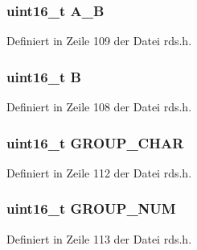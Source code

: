 \subsubsection[{A\+\_\+\+B}]{\setlength{\rightskip}{0pt plus 5cm}uint16\+\_\+t A\+\_\+\+B}\label{structgroup__2b_a226eb9a4ec1152d0c92ce7324916ad56}


Definiert in Zeile 109 der Datei rds.\+h.

\hypertarget{structgroup__2b_ae783bd90764c8455228772c025c064e4}{}
\subsubsection[{B}]{\setlength{\rightskip}{0pt plus 5cm}uint16\+\_\+t B}\label{structgroup__2b_ae783bd90764c8455228772c025c064e4}


Definiert in Zeile 108 der Datei rds.\+h.

\hypertarget{structgroup__2b_a66d4119990dc4c3e040a43885e9bb953}{}
\subsubsection[{G\+R\+O\+U\+P\+\_\+\+C\+H\+A\+R}]{\setlength{\rightskip}{0pt plus 5cm}uint16\+\_\+t G\+R\+O\+U\+P\+\_\+\+C\+H\+A\+R}\label{structgroup__2b_a66d4119990dc4c3e040a43885e9bb953}


Definiert in Zeile 112 der Datei rds.\+h.

\hypertarget{structgroup__2b_a9f692e9f76ee88348d426bcd4e9bc70b}{}
\subsubsection[{G\+R\+O\+U\+P\+\_\+\+N\+U\+M}]{\setlength{\rightskip}{0pt plus 5cm}uint16\+\_\+t G\+R\+O\+U\+P\+\_\+\+N\+U\+M}\label{structgroup__2b_a9f692e9f76ee88348d426bcd4e9bc70b}


Definiert in Zeile 113 der Datei rds.\+h.

\hypertarget{structgroup__2b_a5cd9b1f6413028425796c1129aa8fd87}{}
